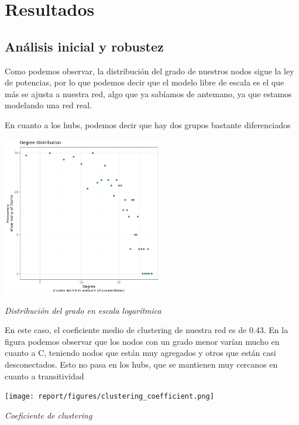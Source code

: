 
\section{Resultados}

\subsection{Análisis inicial y robustez}

Como podemos observar, la distribución del grado de nuestros nodos sigue  la ley de potencias, por lo que podemos decir que el modelo libre de escala es el que más se ajusta a nuestra red, algo que ya sabíamos de antemano, ya que estamos modelando una red real.

En cuanto a los hubs, podemos decir que hay dos grupos bastante diferenciados 
\begin{center}

\includegraphics[width=70mm,scale=1.2]{report/figures/degree_distribution.png}

\caption{\textit{Distribución del grado en escala logarítmica}}

\end{center}

En este caso, el coeficiente medio de clustering de nuestra red es de 0.43.
En la figura podemos observar que los nodos con un grado menor varían mucho en cuanto a C, teniendo nodos que están muy agregados y otros que están casi desconectados. Esto no pasa en los hubs, que se mantienen muy cercanos en cuanto a transitividad

\begin{center}

\texttt{[image: report/figures/clustering\_coefficient.png]}

\caption{\textit{Coeficiente de clustering}}

\end{center}

